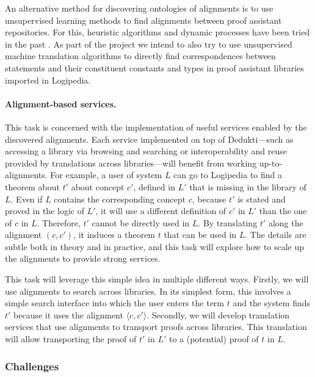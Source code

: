 An alternative method for discovering ontologies of alignments is to
use unsupervised learning methods to find alignments between proof
assistant repositories. For this, heuristic algorithms and dynamic
processes have been tried in the past \cite{GAUTHIER201989}.  As part
of the project we intend to also try to use unsupervised machine
translation algorithms \cite{DBLP:journals/corr/abs-1804-07755} to
directly find correspondences between statements and their constituent
constants and types in proof assistant libraries imported in
Logipedia.

\paragraph*{Alignment-based services.}
This task is concerned with the implementation of useful services
enabled by the discovered alignments. Each service implemented on top
of Dedukti---such as accessing a library via browsing and searching or
interoperability and reuse provided by translations across
libraries---will benefit from working up-to-alignments. For example, a
user of system $L$ can go to Logipedia to find a theorem about $t'$
about concept $c'$, defined in $L'$ that is missing in the library of
$L$. Even if $L$ contains the corresponding concept $c$, because $t'$
is stated and proved in the logic of $L'$, it will use a different
definition of $c'$ in $L'$ than the one of $c$ in $L$.  Therefore,
$t'$ cannot be directly used in $L$. By translating $t'$ along the
alignment $(c,c')$, it induces a theorem $t$ that can be used in
$L$. The details are subtle both in theory and in practice, and this
task will explore how to scale up the alignments to provide strong
services.

This task will leverage this simple idea in multiple different
ways. Firstly, we will use alignments to search across libraries. In
its simplest form, this involves a simple search interface into which
the user enters the term $t$ and the system finds $t'$ because it uses
the alignment $\langle c,c'\rangle$. Secondly, we will develop
translation services that use alignments to transport proofs across
libraries. This translation will allow transporting the proof of $t'$ in
$L'$ to a (potential) proof of $t$ in $L$.


\subsubsection*{Challenges}

